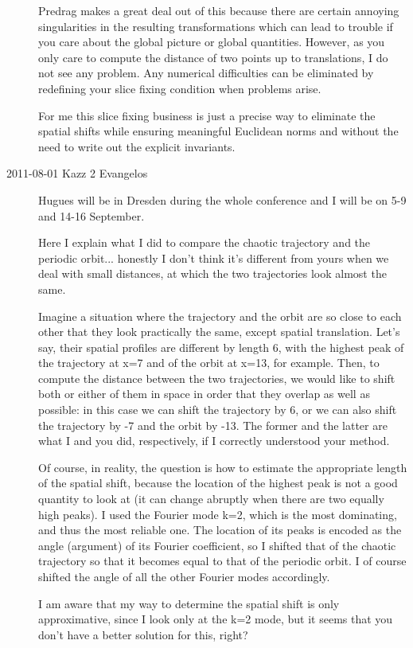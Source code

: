\begin{description}
Predrag makes a great deal out of this because there are certain
annoying singularities in the resulting transformations which can lead
to trouble if you care about the global picture or global quantities.
However, as you only care to compute the distance of two points up to
translations, I do not see any problem. Any numerical difficulties can
be eliminated by redefining your slice fixing condition when problems
arise.

For me this slice fixing business is just a precise way to eliminate
the spatial shifts while ensuring meaningful Euclidean norms and
without the need to write out the explicit invariants.

\item[2011-08-01 Kazz 2 Evangelos] Hugues will be in Dresden during
the whole conference
and I will be on 5-9 and 14-16 September.

Here I explain what I did to compare the chaotic trajectory and the periodic
orbit... honestly I don't think it's different from yours when we deal
with small distances, at which the two trajectories look almost the same.

Imagine a situation where the trajectory and the orbit are so close to each
other that they look practically the same, except spatial translation.
Let's say, their spatial profiles are different by length 6, with the highest
peak of the trajectory at x=7 and of the orbit at x=13, for example.
Then, to compute the distance between the two trajectories, we would like
to shift both or either of them in space in order that they overlap as well
as possible: in this case we can shift the trajectory by 6, or we can also
shift the trajectory by -7 and the orbit by -13. The former and the latter
are what I and you did, respectively, if I correctly understood your method.

Of course, in reality, the question is how to estimate the appropriate
length of the spatial shift, because the location of the highest peak is
not a good quantity to look at (it can change abruptly when there are two
equally high peaks). I used the Fourier mode k=2, which is the most dominating,
and thus the most reliable one. The location of its peaks is encoded as
the angle (argument) of its Fourier coefficient, so I shifted that of
the chaotic trajectory so that it becomes equal to that of the periodic orbit.
I of course shifted the angle of all the other Fourier modes accordingly.

I am aware that my way to determine the spatial shift is only approximative,
since I look only at the k=2 mode, but it seems that you don't have a better
solution for this, right?


\end{description}
